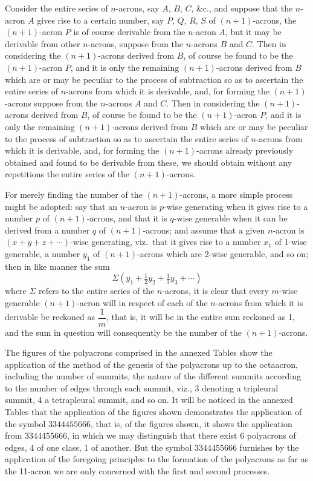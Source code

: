 \documentclass[11pt,a4paper]{article}
\begin{document}
Consider the entire series of $n$-acrons, say $A$, $B$, $C$, \&c., and suppose that the $n$-acron $A$ gives rise to a certain number, say $P$, $Q$, $R$, $S$ of $(n+1)$-acrons, the $(n+1)$-acron $P$ is of course derivable from the $n$-acron $A$, but it may be derivable from other $n$-acrons, suppose from the $n$-acrons $B$ and $C$. Then in considering the $(n+1)$-acrons derived from $B$, of course be found to be the $(n+1)$-acron $P$, and it is only the remaining $(n+1)$-acrons derived from $B$ which are or may be peculiar to the process of subtraction so as to ascertain the entire series of $n$-acrons from which it is derivable, and, for forming the $(n+1)$-acrons suppose from the $n$-acrons $A$ and $C$. Then in considering the $(n+1)$-acrons derived from $B$, of course be found to be the $(n+1)$-acron $P$, and it is only the remaining $(n+1)$-acrons derived from $B$ which are or may be peculiar to the process of subtraction so as to ascertain the entire series of $n$-acrons from which it is derivable, and, for forming the $(n+1)$-acrons already previously obtained and found to be derivable from these, we should obtain without any repetitions the entire series of the $(n+1)$-acrons.

\clearpage

\noindent For merely finding the number of the $(n+1)$-acrons, a more simple process might be adopted: say that an $n$-acron is $p$-wise generating when it gives rise to a number $p$ of $(n+1)$-acrons, and that it is $q$-wise generable when it can be derived from a number $q$ of $(n+1)$-acrons; and assume that a given $n$-acron is $(x+y+z+\cdots)$-wise generating, viz.\ that it gives rise to a number $x_1$ of 1-wise generable, a number $y_1$ of $(n+1)$-acrons which are 2-wise generable, and so on; then in like manner the sum
\[
\Sigma(y_1+\tfrac{1}{2}y_2+\tfrac{1}{3}y_3+\cdots)
\]
where $\Sigma$ refers to the entire series of the $n$-acrons, it is clear that every $m$-wise generable $(n+1)$-acron will in respect of each of the $n$-acrons from which it is derivable be reckoned as $\dfrac{1}{m}$, that is, it will be in the entire sum reckoned as 1, and the sum in question will consequently be the number of the $(n+1)$-acrons.

\medskip

\noindent The figures of the polyacrons comprised in the annexed Tables show the application of the method of the genesis of the polyacrons up to the octaacron, including the number of summits, the nature of the different summits according to the number of edges through each summit, viz., 3 denoting a tripleural summit, 4 a tetrapleural summit, and so on. It will be noticed in the annexed Tables that the application of the figures shown demonstrates the application of the symbol $3344455666$, that is, of the figures shown, it shows the application from $3344455666$, in which we may distinguish that there exist 6 polyacrons of edges, 4 of one class, 1 of another. But the symbol $3344455666$ furnishes by the application of the foregoing principles to the formation of the polyacrons as far as the 11-acron we are only concerned with the first and second processes.
\end{document}
